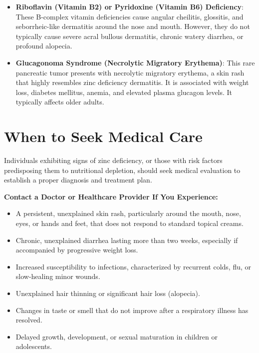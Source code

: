 \begin{itemize}
    \item \textbf{Riboflavin (Vitamin B2) or Pyridoxine (Vitamin B6) Deficiency}: These B-complex vitamin deficiencies cause angular cheilitis, glossitis, and seborrheic-like dermatitis around the nose and mouth. However, they do not typically cause severe acral bullous dermatitis, chronic watery diarrhea, or profound alopecia.
    \item \textbf{Glucagonoma Syndrome (Necrolytic Migratory Erythema)}: This rare pancreatic tumor presents with necrolytic migratory erythema, a skin rash that highly resembles zinc deficiency dermatitis. It is associated with weight loss, diabetes mellitus, anemia, and elevated plasma glucagon levels. It typically affects older adults.
\end{itemize}

\section*{When to Seek Medical Care}
Individuals exhibiting signs of zinc deficiency, or those with risk factors predisposing them to nutritional depletion, should seek medical evaluation to establish a proper diagnosis and treatment plan.

\textbf{Contact a Doctor or Healthcare Provider If You Experience:}
\begin{itemize}
    \item A persistent, unexplained skin rash, particularly around the mouth, nose, eyes, or hands and feet, that does not respond to standard topical creams.
    \item Chronic, unexplained diarrhea lasting more than two weeks, especially if accompanied by progressive weight loss.
    \item Increased susceptibility to infections, characterized by recurrent colds, flu, or slow-healing minor wounds.
    \item Unexplained hair thinning or significant hair loss (alopecia).
    \item Changes in taste or smell that do not improve after a respiratory illness has resolved.
    \item Delayed growth, development, or sexual maturation in children or adolescents.
\end{itemize}

